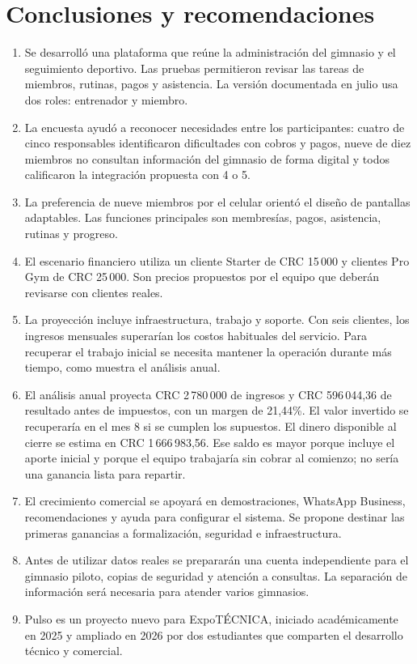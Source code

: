 \section{Conclusiones y recomendaciones}

\begin{enumerate}
  \item Se desarrolló una plataforma que reúne la administración del gimnasio
  y el seguimiento deportivo. Las pruebas permitieron revisar las tareas de
  miembros, rutinas, pagos y asistencia. La versión documentada en julio usa
  dos roles: entrenador y miembro.
  \item La encuesta ayudó a reconocer necesidades entre los participantes:
  cuatro de cinco responsables identificaron dificultades con cobros y pagos,
  nueve de diez miembros no consultan información del gimnasio de forma digital
  y todos calificaron la integración propuesta con 4 o 5.
  \item La preferencia de nueve miembros por el celular orientó el diseño de
  pantallas adaptables. Las funciones principales son membresías, pagos,
  asistencia, rutinas y progreso.
  \item El escenario financiero utiliza un cliente Starter de CRC 15\,000 y
  clientes Pro Gym de CRC 25\,000. Son precios propuestos por el equipo que
  deberán revisarse con clientes reales.
  \item La proyección incluye infraestructura, trabajo y soporte. Con seis
  clientes, los ingresos mensuales superarían los costos habituales del
  servicio. Para recuperar el trabajo inicial se necesita mantener la operación
  durante más tiempo, como muestra el análisis anual.
  \item El análisis anual proyecta CRC 2\,780\,000 de ingresos y
  CRC 596\,044,36 de resultado antes de impuestos, con un margen de 21,44\%.
  El valor invertido se recuperaría en el mes 8 si se cumplen los supuestos.
  El dinero disponible al cierre se estima en CRC 1\,666\,983,56. Ese saldo es
  mayor porque incluye el aporte inicial y porque el equipo trabajaría sin
  cobrar al comienzo; no sería una ganancia lista para repartir.
  \item El crecimiento comercial se apoyará en demostraciones,
  WhatsApp Business, recomendaciones y ayuda para configurar el sistema.
  Se propone destinar las primeras ganancias a formalización, seguridad e
  infraestructura.
  \item Antes de utilizar datos reales se prepararán una cuenta independiente
  para el gimnasio piloto, copias de seguridad y atención a consultas. La
  separación de información será necesaria para atender varios gimnasios.
  \item Pulso es un proyecto nuevo para ExpoTÉCNICA, iniciado académicamente en
  2025 y ampliado en 2026 por dos estudiantes que comparten el desarrollo técnico
  y comercial.
\end{enumerate}

